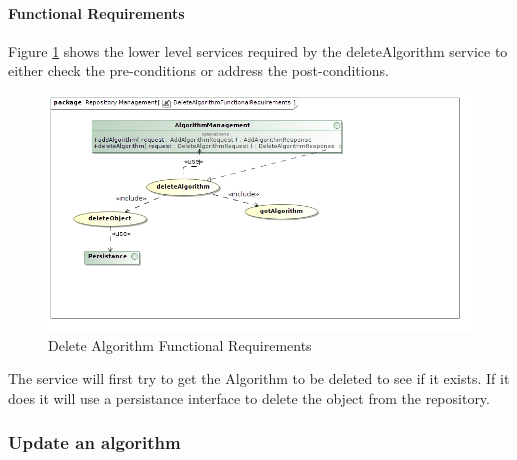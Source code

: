 \paragraph{Functional Requirements}
Figure \ref{fig:deleteAlgorithmFuncReq} shows the lower level services required
by the deleteAlgorithm service to either check the pre-conditions or address the
post-conditions.

\begin{figure}[H]
  \begin{center}
  \includegraphics[scale=0.5]{../Diagrams and Charts/Test Data/DeleteAlgorithmFunctionalRequirements.jpg}
  \caption{Delete Algorithm Functional Requirements}
  \label{fig:deleteAlgorithmFuncReq}
  \end{center}  
 \end{figure}

 The service will first try to get the Algorithm to be deleted to see if it
 exists. If it does it will use a persistance interface to delete the object
 from the repository.

\subsubsection {Update an algorithm}

